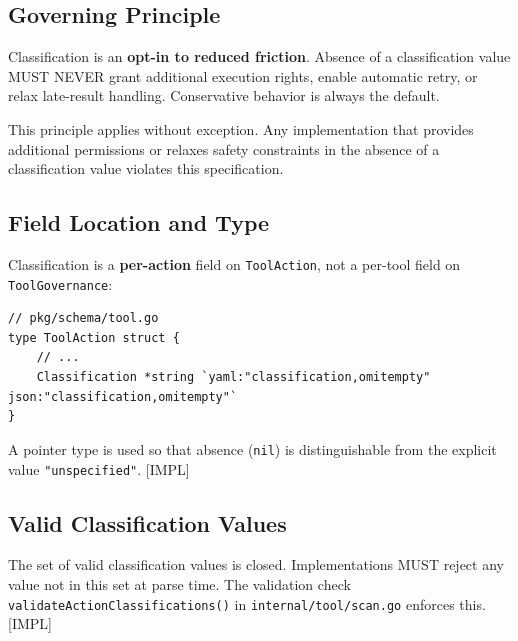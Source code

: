 \subsection{Governing Principle}

\begin{tcolorbox}[colback=red!5, colframe=red!50, title=Governing Principle — Classification]
  Classification is an \textbf{opt-in to reduced friction}.  Absence of a
  classification value MUST NEVER grant additional execution rights, enable
  automatic retry, or relax late-result handling.  Conservative behavior is
  always the default.
\end{tcolorbox}

\noindent This principle applies without exception.  Any implementation that
provides additional permissions or relaxes safety constraints in the absence of a
classification value violates this specification.

\subsection{Field Location and Type}

Classification is a \textbf{per-action} field on \texttt{ToolAction}, not a
per-tool field on \texttt{ToolGovernance}:

\begin{verbatim}
// pkg/schema/tool.go
type ToolAction struct {
    // ...
    Classification *string `yaml:"classification,omitempty" json:"classification,omitempty"`
}
\end{verbatim}

A pointer type is used so that absence (\texttt{nil}) is distinguishable from
the explicit value \texttt{"unspecified"}.  [IMPL]

\subsection{Valid Classification Values}

The set of valid classification values is closed.  Implementations MUST reject
any value not in this set at parse time.  The validation check
\texttt{validateActionClassifications()} in \texttt{internal/tool/scan.go}
enforces this.  [IMPL]

